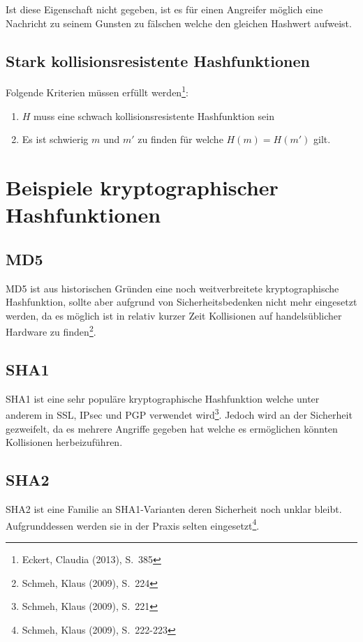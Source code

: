 Ist diese Eigenschaft nicht gegeben, ist es für einen Angreifer
möglich eine Nachricht zu seinem Gunsten zu fälschen welche den
gleichen Hashwert aufweist.

\subsection{Stark kollisionsresistente Hashfunktionen}

Folgende Kriterien müssen erfüllt werden\footnote{Eckert, Claudia
  (2013), S.~385}:

\begin{enumerate}
\item $H$ muss eine schwach kollisionsresistente Hashfunktion sein
\item Es ist schwierig $m$ und $m'$ zu finden für welche $H(m) =
  H(m')$ gilt.
\end{enumerate}

\section{Beispiele kryptographischer Hashfunktionen}

\subsection{\ac{MD5}}

MD5 ist aus historischen Gründen eine noch weitverbreitete
kryptographische Hashfunktion, sollte aber aufgrund von
Sicherheitsbedenken nicht mehr eingesetzt werden, da es möglich ist in
relativ kurzer Zeit Kollisionen auf handelsüblicher Hardware zu
finden\footnote{Schmeh, Klaus (2009), S.~224}.

\subsection{\ac{SHA1}}

SHA1 ist eine sehr populäre kryptographische Hashfunktion welche unter
anderem in SSL, IPsec und PGP verwendet wird\footnote{Schmeh, Klaus
  (2009), S.~221}.  Jedoch wird an der Sicherheit gezweifelt, da es
mehrere Angriffe gegeben hat welche es ermöglichen könnten Kollisionen
herbeizuführen.

\subsection{\ac{SHA2}}

SHA2 ist eine Familie an SHA1-Varianten deren Sicherheit noch unklar
bleibt.  Aufgrunddessen werden sie in der Praxis selten
eingesetzt\footnote{Schmeh, Klaus (2009), S.~222-223}.


